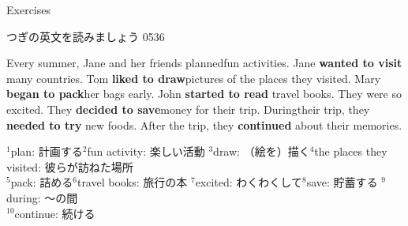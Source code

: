 \documentclass[aspectratio=169,xcolor={dvipsnames,table}]{beamer}
\begin{document}
\begin{frame}[plain,t]{Exercises}

{\small つぎの英文を読みましょう}%
\hfill{\tiny 0536}\,{\scriptsize {}}

\begin{tcolorbox}
Every summer, Jane and her friends planned\footnotemark[1] fun activities\footnotemark[2].
Jane {\bfseries wanted to visit} many countries.
Tom {\bfseries liked to draw}\footnotemark[3] pictures of the places they visited\footnotemark[4].
Mary {\bfseries began to pack}\footnotemark[5] her bags early.
John {\bfseries started to read} travel books\footnotemark[6].
They were so excited\footnotemark[7].
They {\bfseries decided to save}\footnotemark[8] money for their trip.
During\footnotemark[9] their trip, they {\bfseries needed to try} new foods.
After the trip, they {\bfseries continued} about their memories.
\end{tcolorbox}

\vspace*{40pt}
\scriptsize
$^{1}$plan: 計画する\hfill{}$^{2}$fun activity: 楽しい活動\hfill{}%
$^{3}$draw: （絵を）描く\hfill$^{4}$the places they visited: 彼らが訪ねた場所\\%
$^{5}$pack: 詰める\hfill{}$^{6}$travel books: 旅行の本\hfill{}%
$^{7}$excited: わくわくして\hfill{}$^{8}$save: 貯蓄する\hfill%
$^{9}$during: ～の間\\
$^{10}$continue: 続ける

\end{frame}
\end{document}
